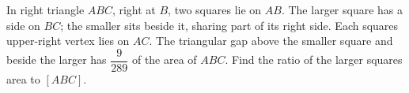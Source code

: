 In right triangle $ABC$, right at $B$, two squares lie on $AB$. The larger square has a side on $BC$; the smaller sits beside it, sharing part of its right side. Each square\textquotesingle s upper-right vertex lies on $AC$. The triangular gap above the smaller square and beside the larger has $\dfrac{9}{289}$ of the area of $ABC$. Find the ratio of the larger square\textquotesingle s area to $[ABC]$.
